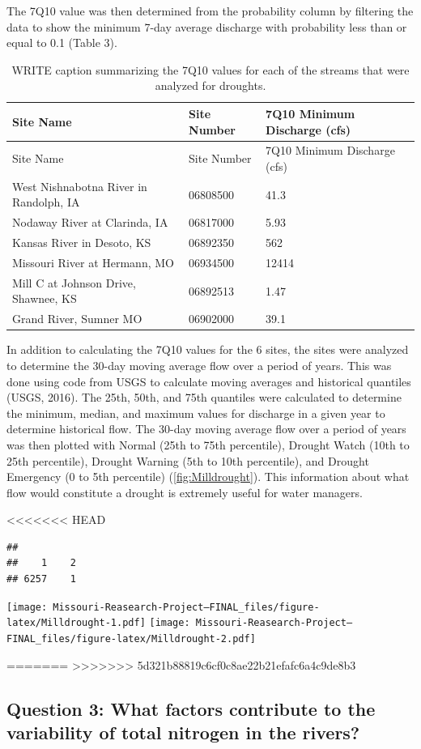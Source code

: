 \documentclass[12pt,]{article}
\begin{document}
The 7Q10 value was then determined from the probability column by
filtering the data to show the minimum 7-day average discharge with
probability less than or equal to 0.1 (Table 3).

\begin{longtable}[]{@{}lll@{}}
\caption{WRITE caption summarizing the 7Q10 values for each of the
streams that were analyzed for droughts.}\tabularnewline
\toprule
Site Name & Site Number & 7Q10 Minimum Discharge (cfs)\tabularnewline
\midrule
\endfirsthead
\toprule
Site Name & Site Number & 7Q10 Minimum Discharge (cfs)\tabularnewline
\midrule
\endhead
West Nishnabotna River in Randolph, IA & 06808500 & 41.3\tabularnewline
Nodaway River at Clarinda, IA & 06817000 & 5.93\tabularnewline
Kansas River in Desoto, KS & 06892350 & 562\tabularnewline
Missouri River at Hermann, MO & 06934500 & 12414\tabularnewline
Mill C at Johnson Drive, Shawnee, KS & 06892513 & 1.47\tabularnewline
Grand River, Sumner MO & 06902000 & 39.1\tabularnewline
\bottomrule
\end{longtable}

In addition to calculating the 7Q10 values for the 6 sites, the sites
were analyzed to determine the 30-day moving average flow over a period
of years. This was done using code from USGS to calculate moving
averages and historical quantiles (USGS, 2016). The 25th, 50th, and 75th
quantiles were calculated to determine the minimum, median, and maximum
values for discharge in a given year to determine historical flow. The
30-day moving average flow over a period of years was then plotted with
Normal (25th to 75th percentile), Drought Watch (10th to 25th
percentile), Drought Warning (5th to 10th percentile), and Drought
Emergency (0 to 5th percentile) (\autoref{fig:Milldrought}). This
information about what flow would constitute a drought is extremely
useful for water managers.

<<<<<<< HEAD
\begin{verbatim}
## 
##    1    2 
## 6257    1
\end{verbatim}

\texttt{[image: Missouri-Reasearch-Project---FINAL\_files/figure-latex/Milldrought-1.pdf]}
\texttt{[image: Missouri-Reasearch-Project---FINAL\_files/figure-latex/Milldrought-2.pdf]}

=======
>>>>>>> 5d321b88819c6cf0c8ae22b21efafc6a4c9de8b3
\hypertarget{question-3-what-factors-contribute-to-the-variability-of-total-nitrogen-in-the-rivers}{%
\subsection{Question 3: What factors contribute to the variability of
total nitrogen in the
rivers?}\label{question-3-what-factors-contribute-to-the-variability-of-total-nitrogen-in-the-rivers}}
\end{document}
